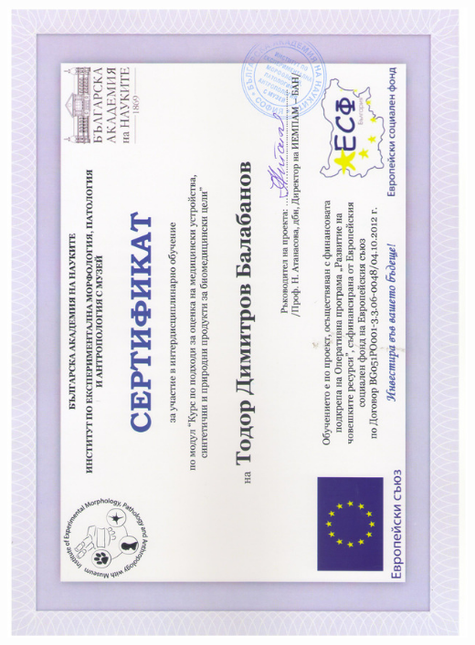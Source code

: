 \documentclass[english,a4paper]{europasscv}
\begin{document}
\includegraphics[width=\textwidth,height=\textheight,keepaspectratio]{IEMPAM2014_1}
\end{document}
